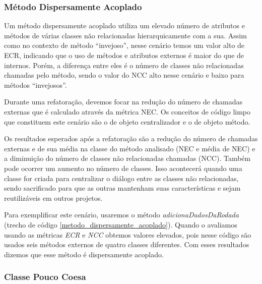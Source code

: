 


\subsubsection{Método Dispersamente Acoplado}
	
Um método dispersamente acoplado utiliza um elevado número de atributos e métodos de várias classes não relacionadas hierarquicamente com a sua. Assim como no contexto de método ``invejoso'', nesse cenário temos um valor alto de ECR, indicando que o uso de métodos e atributos externos é maior do que de internos. Porém, a diferença entre eles é o número de classes não relacionadas chamadas pelo método, sendo o valor do NCC alto nesse cenário e baixo para métodos ``invejosos''.
	
Durante uma refatoração, devemos focar na redução do número de chamadas externas que é calculado através da métrica NEC. Os conceitos de código limpo que constituem este cenário são o de objeto centralizador e o de objeto método.
	
Os resultados esperados após a refatoração são a redução do número de chamadas externas e de sua média na classe do método analisado (NEC e média de NEC) e a diminuição do número de classes não relacionadas chamadas (NCC). Também pode ocorrer um aumento no número de classes. Isso acontecerá quando uma classe for criada para centralizar o diálogo entre as classes não relacionadas, sendo sacrificado para que as outras mantenham suas características e sejam reutilizáveis em outros projetos. 
	  
Para exemplificar este cenário, usaremos o método \textit{adicionaDadosDaRodada} (trecho de código \ref{metodo_dispersamente_acoplado}). Quando o avaliamos usando as métricas \textit{ECR} e \textit{NCC} obtemos valores elevados, pois nesse código são usados seis métodos externos de quatro classes diferentes. Com esses resultados dizemos que esse método é dispersamente acoplado.
  
                                      
                      

\subsubsection{Classe Pouco Coesa}
    
